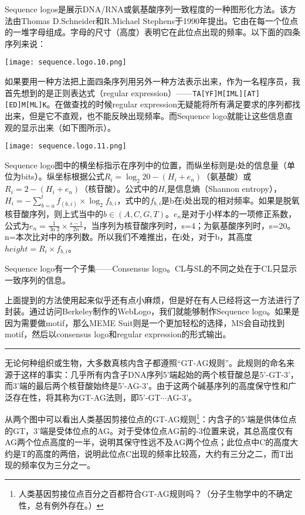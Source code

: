 \documentclass[11pt,a4paper,twoside]{book}
\begin{document}
{\small
Sequence logos是展示DNA/RNA或氨基酸序列一致程度的一种图形化方法。该方法由Thomas D.Schneider和R.Michael Stephens于1990年提出。它由在每一个位点的一堆字母组成。字母的尺寸（高度）表明它在此位点出现的频率。以下面的四条序列来说：
\begin{center}
  \texttt{[image: sequence.logo.10.png]}
\end{center}

如果要用一种方法把上面四条序列用另外一种方法表示出来，作为一名程序员，我首先想到的是正则表达式（regular expression）——\verb|TA[YF]M[IML][AT][ED]M[ML]K|。在做查找的时候regular expression无疑能将所有满足要求的序列都找出来，但是它不直观，也不能反映出现频率。而Sequence logo就能让这些信息直观的显示出来（如下图所示）。
\begin{center}
  \texttt{[image: sequence.logo.11.png]}
\end{center}

Sequence logo图中的横坐标指示在序列中的位置，而纵坐标则是i处的信息量（单位为bits）。纵坐标根据公式$R_i = \log_2 20 - (H_i + e_n)$（氨基酸）或$R_i = 2 - (H_i + e_n)$（核苷酸）。公式中的$H_i$是信息熵（Shannon entropy），$H_i = -\sum_{b=a}^{t}f_{(b,i)} \times \log_2 f_{b,i}$，式中的$f_{b,i}$是b在i处出现的相对频率。如果是脱氧核苷酸序列，则上式当中的$b \in (A, C, G, T)$。$e_n$是对于小样本的一项修正系数，公式为$e_n = \frac{1}{\ln 2} \times \frac{s-1}{2n}$，当序列为核苷酸序列时，s=4；为氨基酸序列时，s=20。n=本次比对中的序列数。所以我们不难推出，在i处，对于b，其高度$height = R_i \times f_{b,i}$。

Sequence logo有一个子集——Consensus logo。CL与SL的不同之处在于CL只显示一致序列的信息。

上面提到的方法使用起来似乎还有点小麻烦，但是好在有人已经将这一方法进行了封装。通过访问Berkeley制作的WebLogo，我们就能够制作Sequence logo。如果是因为需要做motif，那么MEME Suit则是一个更加轻松的选择，MS会自动找到motif，然后以consensus logo和regular expression的形式输出。
}

\hrule height 3pt
\vspace{0.5cm}

无论何种组织或生物，大多数真核内含子都遵照“GT-AG规则”。此规则的命名来源于这样的事实：几乎所有内含子DNA序列5'端起始的两个核苷酸总是5'-GT-3'，而3'端的最后两个核苷酸始终是5'-AG-3'。由于这两个碱基序列的高度保守性和广泛存在性，将其称为GT-AG法则，即5'-GT$\cdots$AG-3'。

从两个图中可以看出人类基因剪接位点的GT-AG规则\footnote{人类基因剪接位点百分之百都符合GT-AG规则吗？（分子生物学中的不确定性，总有例外存在。）}：内含子的5'端是供体位点的GT，3'端是受体位点的AG。对于受体位点AG前的-3位置来说，其总高度仅有AG两个位点高度的一半，说明其保守性远不及AG两个位点；此位点中C的高度大约是T的高度的两倍，说明此位点C出现的频率比较高，大约有三分之二，而T出现的频率仅为三分之一。
\end{document}
